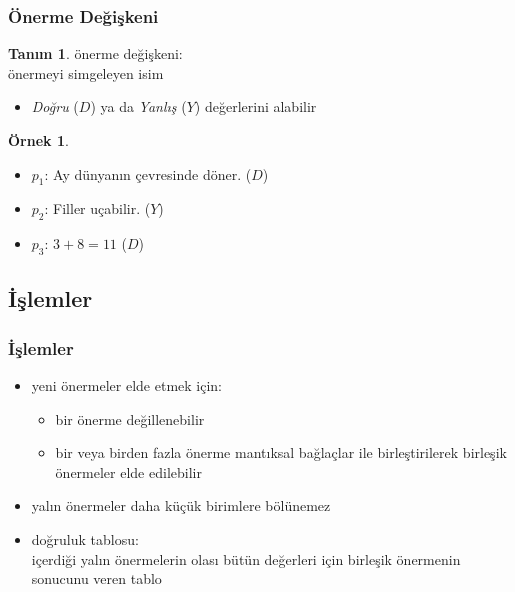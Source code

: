 \documentclass[dvipsnames]{beamer}
\theoremstyle{definition}
\newtheorem{tanim}[theorem]{Tanım}
\theoremstyle{example}
\newtheorem{ornek}[theorem]{Örnek}
\theoremstyle{plain}
\begin{document}
\begin{frame}
  \frametitle{Önerme Değişkeni}

  \begin{tanim}
    \alert{önerme değişkeni}:\\
      önermeyi simgeleyen isim

    \begin{itemize}
      \item \emph{Doğru} ($D$) ya da \emph{Yanlış} ($Y$) değerlerini alabilir
    \end{itemize}
  \end{tanim}

  \pause
  \begin{ornek}
    \begin{itemize}
      \item $p_1$: Ay dünyanın çevresinde döner. ($D$)
      \item $p_2$: Filler uçabilir. ($Y$)
      \item $p_3$: $3+8=11$ ($D$)
    \end{itemize}
  \end{ornek}
\end{frame}

\subsection{İşlemler}

\begin{frame}
  \frametitle{İşlemler}

  \begin{itemize}
    \item yeni önermeler elde etmek için:
    \begin{itemize}
      \item bir önerme değillenebilir
      \item bir veya birden fazla önerme \alert{mantıksal bağlaçlar} ile
        birleştirilerek \alert{birleşik önermeler} elde edilebilir
    \end{itemize}
    \item \alert{yalın önermeler} daha küçük birimlere bölünemez
  \end{itemize}

  \pause
  \begin{itemize}
    \item \alert{doğruluk tablosu}:\\
      içerdiği yalın önermelerin olası bütün değerleri için birleşik önermenin
      sonucunu veren tablo
  \end{itemize}
\end{frame}
\end{document}
